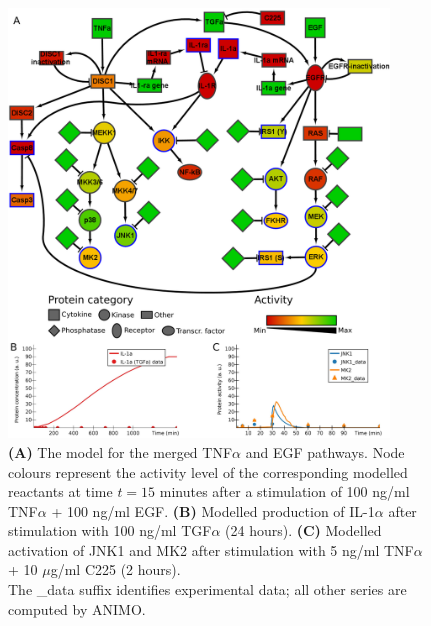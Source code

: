 \documentclass{bmcart}
\begin{document}
\def\largeModelScale{0.18}%
\def\legendScalaColori{0.21}%
\def\legendScalaForme{0.21}%
\def\scalaGrafici{0.0709}%
\begin{figure}[!htpb]
\centering
  \includegraphics[width=0.9\textwidth]{images/large_network_merged_no_hypotheses_completa}
\caption{
{\bf(A)} %
The model for the merged TNF$\alpha$ and EGF pathways. Node colours represent the
activity level of the corresponding modelled reactants at time $t = 15$ minutes after
a stimulation of 100 ng/ml TNF$\alpha$ + 100 ng/ml EGF.
{\bf(B)} %
Modelled production of IL-1$\alpha$ after stimulation with 100 ng/ml TGF$\alpha$ (24 hours).
{\bf(C)} %
Modelled activation of JNK1 and MK2 after stimulation with 5 ng/ml TNF$\alpha$ + 10 $\mu$g/ml C225 (2 hours).
\\
The {\sf \_{}data} suffix identifies experimental data; all other series are computed by ANIMO.}\label{fig:large-model-all}
\end{figure}
\end{document}

